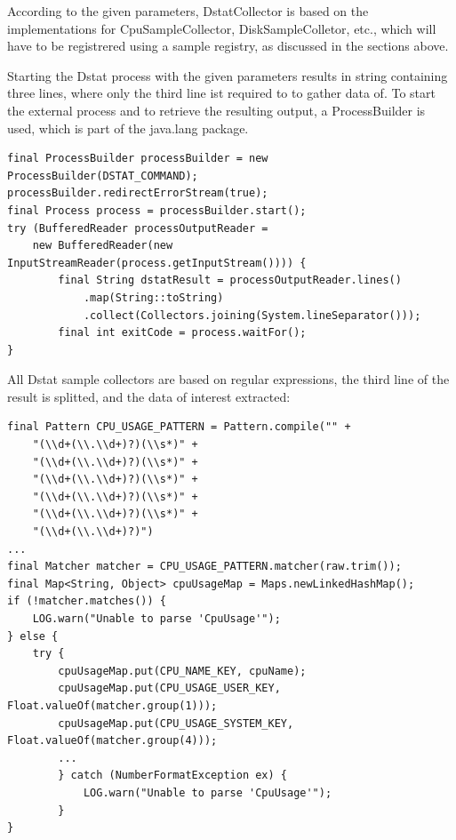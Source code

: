 According to the given parameters, DstatCollector is based on the implementations for CpuSampleCollector, DiskSampleColletor, etc.,
which will have to be registrered using a sample registry, as discussed in the sections above.

Starting the Dstat process with the given parameters results in string containing three lines, where only the third line ist required to
to gather data of. To start the external process and to retrieve the resulting output, a ProcessBuilder is used, which is part of
the java.lang package.
\begin{lstlisting}[caption={ProcessBuilder in "DstatCollector"}, captionpos=b, label={lst:dstatprocessbuilder}]
final ProcessBuilder processBuilder = new ProcessBuilder(DSTAT_COMMAND);
processBuilder.redirectErrorStream(true);
final Process process = processBuilder.start();
try (BufferedReader processOutputReader =
    new BufferedReader(new InputStreamReader(process.getInputStream()))) {
        final String dstatResult = processOutputReader.lines()
            .map(String::toString)
            .collect(Collectors.joining(System.lineSeparator()));
        final int exitCode = process.waitFor();
}
\end{lstlisting}

All Dstat sample collectors are based on regular expressions, the third line of the result is splitted, and the data of interest
extracted:
\begin{lstlisting}[caption={"CpuSampleCollector", Extract sample data}, captionpos=b, label={lst:cpusamplecollector}]
final Pattern CPU_USAGE_PATTERN = Pattern.compile("" +
    "(\\d+(\\.\\d+)?)(\\s*)" +
    "(\\d+(\\.\\d+)?)(\\s*)" +
    "(\\d+(\\.\\d+)?)(\\s*)" +
    "(\\d+(\\.\\d+)?)(\\s*)" +
    "(\\d+(\\.\\d+)?)(\\s*)" +
    "(\\d+(\\.\\d+)?)")
...
final Matcher matcher = CPU_USAGE_PATTERN.matcher(raw.trim());
final Map<String, Object> cpuUsageMap = Maps.newLinkedHashMap();
if (!matcher.matches()) {
    LOG.warn("Unable to parse 'CpuUsage'");
} else {
    try {
        cpuUsageMap.put(CPU_NAME_KEY, cpuName);
        cpuUsageMap.put(CPU_USAGE_USER_KEY, Float.valueOf(matcher.group(1)));
        cpuUsageMap.put(CPU_USAGE_SYSTEM_KEY, Float.valueOf(matcher.group(4)));
        ...
        } catch (NumberFormatException ex) {
            LOG.warn("Unable to parse 'CpuUsage'");
        }
}
\end{lstlisting}

